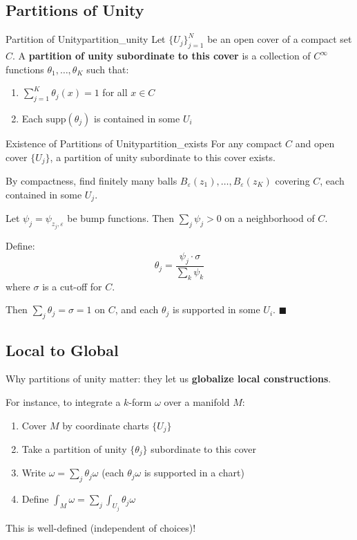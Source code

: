 \documentclass[11pt, letterpaper, openany]{book}
\renewenvironment{proof}[1][\proofname]{%
  \tcolorbox[blanker, breakable, left=1em,
    before skip=1em, after skip=1em,
    borderline west={2pt}{0pt}{MagicTeal!50},
    colback=MagicCream,
    before upper={\textcolor{MagicTeal}{\sffamily\bfseries #1.}\space}
  ]%
}{%
  \hfill\textcolor{MagicTeal}{\ensuremath{\blacksquare}}\endtcolorbox%
}
\begin{document}
\subsection{Partitions of Unity}

\begin{defn}{Partition of Unity}{partition_unity}
Let $\{U_j\}_{j=1}^N$ be an open cover of a compact set $C$. A \textbf{partition of unity subordinate to this cover} is a collection of $C^\infty$ functions $\theta_1, \ldots, \theta_K$ such that:
\begin{enumerate}
    \item $\sum_{j=1}^K \theta_j(x) = 1$ for all $x \in C$
    \item Each $\text{supp}(\theta_j)$ is contained in some $U_i$
\end{enumerate}
\end{defn}

\begin{thm}{Existence of Partitions of Unity}{partition_exists}
For any compact $C$ and open cover $\{U_j\}$, a partition of unity subordinate to this cover exists.
\end{thm}

\begin{proof}
By compactness, find finitely many balls $B_\varepsilon(z_1), \ldots, B_\varepsilon(z_K)$ covering $C$, each contained in some $U_j$.

Let $\psi_j = \psi_{z_j, \varepsilon}$ be bump functions. Then $\sum_j \psi_j > 0$ on a neighborhood of $C$.

Define:
\[\theta_j = \frac{\psi_j \cdot \sigma}{\sum_k \psi_k}\]
where $\sigma$ is a cut-off for $C$.

Then $\sum_j \theta_j = \sigma = 1$ on $C$, and each $\theta_j$ is supported in some $U_i$.
\end{proof}

\subsection{Local to Global}

\begin{remark}
Why partitions of unity matter: they let us \textbf{globalize local constructions}.

For instance, to integrate a $k$-form $\omega$ over a manifold $M$:
\begin{enumerate}
    \item Cover $M$ by coordinate charts $\{U_j\}$
    \item Take a partition of unity $\{\theta_j\}$ subordinate to this cover
    \item Write $\omega = \sum_j \theta_j \omega$ (each $\theta_j \omega$ is supported in a chart)
    \item Define $\int_M \omega = \sum_j \int_{U_j} \theta_j \omega$
\end{enumerate}
This is well-defined (independent of choices)!
\end{remark}
\end{document}
